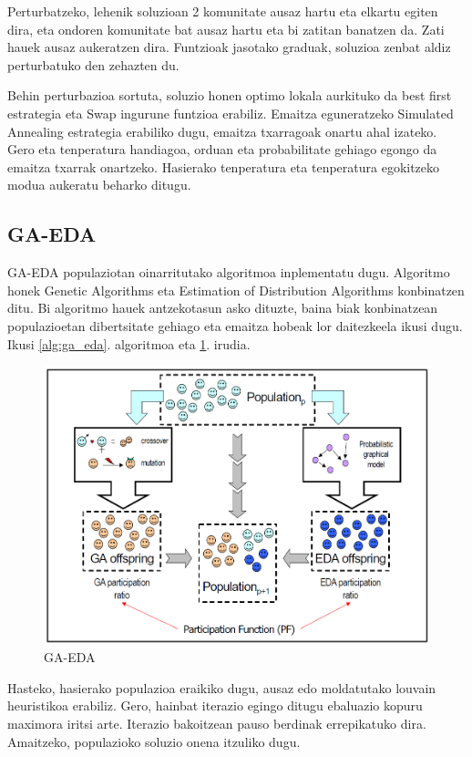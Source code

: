 \documentclass[sigconf]{acmart}
\begin{document}
Perturbatzeko, lehenik soluzioan 2 komunitate ausaz hartu eta elkartu egiten dira, eta ondoren komunitate bat ausaz hartu eta bi zatitan banatzen da. Zati hauek ausaz aukeratzen dira. Funtzioak jasotako graduak, soluzioa zenbat aldiz perturbatuko den zehazten du. 

Behin perturbazioa sortuta, soluzio honen optimo lokala aurkituko da best first estrategia eta Swap ingurune funtzioa erabiliz. Emaitza eguneratzeko Simulated Annealing estrategia erabiliko dugu, emaitza txarragoak onartu ahal izateko. Gero eta tenperatura handiagoa, orduan eta probabilitate gehiago egongo da emaitza txarrak onartzeko. Hasierako tenperatura eta tenperatura egokitzeko modua aukeratu beharko ditugu.

\subsection{GA-EDA}
GA-EDA \cite{pena2004ga} populaziotan oinarritutako algoritmoa inplementatu dugu. Algoritmo honek Genetic Algorithms eta Estimation of Distribution Algorithms konbinatzen ditu. Bi algoritmo hauek antzekotasun asko dituzte, baina biak konbinatzean populazioetan dibertsitate gehiago eta emaitza hobeak lor daitezkeela ikusi dugu. Ikusi \ref{alg:ga_eda}. algoritmoa eta \ref{fig:ga_eda}. irudia.

\begin{figure}
    \centering
    \includegraphics[width=\linewidth]{GA-EDA}
    \caption{GA-EDA}
    \label{fig:ga_eda}
\end{figure}

Hasteko, hasierako populazioa eraikiko dugu, ausaz edo moldatutako louvain heuristikoa erabiliz. Gero, hainbat iterazio egingo ditugu ebaluazio kopuru maximora iritsi arte. Iterazio bakoitzean pauso berdinak errepikatuko dira. Amaitzeko, populazioko soluzio onena itzuliko dugu.  
\end{document}

